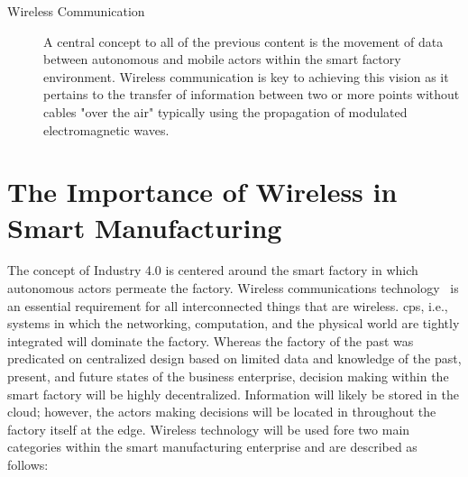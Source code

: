 \begin{description}
	\item[Wireless Communication] A central concept to all of the previous content is the movement of data between autonomous and mobile actors within the smart factory environment.  Wireless communication is key to achieving this vision as it pertains to the transfer of information between two or more points without cables "over the air" typically using the propagation of modulated electromagnetic waves.


\end{description}



\section{The Importance of Wireless in Smart Manufacturing}
The concept of Industry 4.0 is centered around the smart factory in which autonomous actors permeate the factory.  Wireless communications technology~\cite{proakis1995digital} is an essential requirement for all interconnected things that are wireless. \Gls{cps}, i.e., systems in which the networking, computation, and the physical world are tightly integrated will dominate the factory.  Whereas the factory of the past was predicated on centralized design based on limited data and knowledge of the past, present, and future states of the business enterprise, decision making within the smart factory will be highly decentralized.  Information will likely be stored in the cloud; however, the actors making decisions will be located in throughout the factory itself at the edge.  Wireless technology will be used fore two main categories within the smart manufacturing enterprise and are described as follows:

